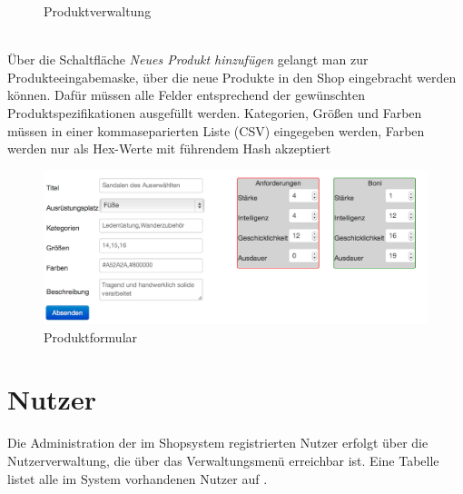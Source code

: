 \begin{figure}[h!]
  \centering
  \caption{Produktverwaltung}
  \label{fig:Produktverwaltung}
\end{figure}
\text{}\vspace*{-1em}\\
Über die Schaltfläche \textit{Neues Produkt hinzufügen}  gelangt man zur Produkteeingabemaske, über die neue Produkte in den Shop eingebracht werden können. Dafür müssen alle Felder entsprechend der gewünschten Produktspezifikationen ausgefüllt werden. Kategorien, Größen und Farben müssen in einer kommaseparierten Liste (CSV) eingegeben werden, Farben werden nur als Hex-Werte mit führendem Hash akzeptiert 

\begin{figure}[h!]
  \centering
  \includegraphics[width=\textwidth]{img/Produktformular.png}
  \caption{Produktformular}
  \label{fig:Produktformular}
\end{figure}

\newpage

\section{Nutzer}
\label{chp:Nutzer}
Die Administration der im Shopsystem registrierten Nutzer erfolgt über die Nutzerverwaltung, die über das Verwaltungsmenü erreichbar ist. Eine Tabelle listet alle im System vorhandenen Nutzer auf .

